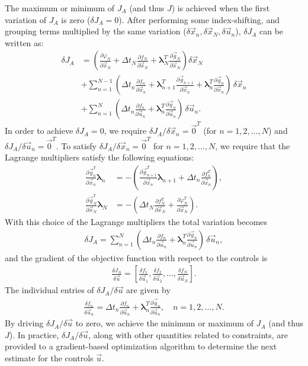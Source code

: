 \documentclass[twocolumn,numbook]{svjour3}          %
\newcommand{\fsum}[3]{\sum_{#1}^{#2}{#3}}
\newcommand{\pder}[2]{\frac{\partial #1}{\partial #2}}
\def\u{{\vec u}}
\def\x{{\vec x}}
\def\p{{\vec{g}}}
\def\0{{\vec 0}}
\def\blambda{{\pmb{\lambda}}}%
\def\M{{\varphi}}
\def\F{f}
\def\myobj{J}
\begin{document}
The maximum or minimum of $\myobj_A$ (and thus $\myobj$) is achieved when the first variation of $\myobj_A$ is 
zero ($\delta \myobj_A=0$). After performing some index-shifting, and grouping
terms multiplied by the same variation ($\delta \x_n, \delta \x_N,
\delta \u_n$), $\delta \myobj_A$ can be written as:
%
\begin{align}
\label{eq:discreteAfterRegrouping}
  \delta \myobj_A &=
  \left (
    \pder{\M_N}{\x_N}
    + \Delta t_N \pder{\F_N}{\x_N}
    + \blambda_N^T\pder{\p_N}{\x_N}
    \right ) \delta \x_N
    \nonumber \\
    &+\fsum{n=1}{N-1}{
      \left (
        \Delta t_n \pder{ \F_n}{\x_n}
        +\blambda^T_{n+1}\pder{\p_{n+1}}{\x_n}
        +\blambda^T_n\pder{\p_n}{\x_n}
      \right ) \, \delta \x_n
    } \nonumber \\
    &+\fsum{n=1}{N}{
      \left (
        \Delta t_n \pder{\F_n}{\u_n}
        +\blambda^T_n\pder{\p_n}{\u_n}
      \right ) \, \delta \u_n.
    }
\end{align}
%
In order to achieve $\delta \myobj_A=0$, we require $\delta \myobj_A / \delta \x_n=\0^T$ (for $n=1,2, \ldots, N$) and $\delta \myobj_A / \delta \u_n=\0^T$. To satisfy $\delta \myobj_A / \delta \x_n =\0^T$ for $n=1,2, \ldots, N$, we require that the Lagrange multipliers satisfy the following equations:
%
\begin{align}
\label{eq:discreteODE}
 \pder{\p_n^T}{\x_n}  \blambda_n &= -
 \left (\pder{\p_{n+1}^T}{\x_n} \blambda_{n+1} + \Delta t_n \pder{\F^T_n}{\x_n}
 \right ),%
\\
\label{eq:discreteBC}
  \pder{\p_N^T}{\x_N} \blambda_N &= -
  \left ( \Delta t_N \pder{\F^T_N}{\x_N} + \pder{\M_N^T}{\x_N} \right ).
\end{align}
%
With this choice of the Lagrange multipliers the total variation becomes
\begin{align*}
  \delta \myobj_A =
    \fsum{n=1}{N}{
      \left (
        \Delta t_n \pder{\F_n}{\u_n}
      +\blambda^T_n\pder{\p_n}{\u_n}
      \right ) \, \delta \u_n ,
    }
\end{align*}
and the gradient of the objective function with respect to the controls is
\begin{align}
\label{eq:optimizerDiscreteGradient}
  \frac{\delta \myobj_A}{\delta \u} = \left [
  \frac{\delta f_1}{\delta \u_1}, \frac{\delta f_2}{\delta \u_2},
  \ldots,
  \frac{\delta f_N}{\delta \u_N} \right ].
\end{align}
The individual entries of $\delta \myobj_A/\delta \u$ are given by
\begin{align}
\label{eq:discreteGradient}
  \frac{\delta f_n}{\delta \u_n} =
  \Delta t_n  \pder{\F_n}{\u_n}
  +\blambda^T_n\pder{\p_n}{\u_n}, \quad n=1,2,\ldots,N.
\end{align}
%
By driving $\delta \myobj_A / \delta \u$ to zero, we achieve the minimum or 
maximum of $\myobj_A$ (and thus $\myobj$). In practice, $\delta \myobj_A / \delta \u$, 
along with other quantities related to constraints, are provided to a 
gradient-based optimization algorithm to determine the next estimate for the controls $\u$.
\end{document}
